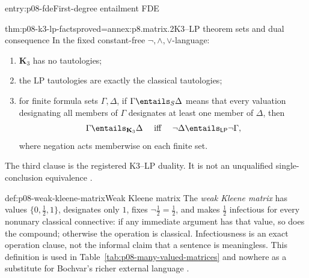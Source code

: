 \begin{systementry}{entry:p08-fde}{First-degree entailment FDE}
\end{systementry}

\begin{hbtheorem}{thm:p08-k3-lp-facts}{proved=annex:p8.matrix.2}{K3--LP theorem sets and dual consequence}
In the fixed constant-free \(\neg,\land,\lor\)-language:
\begin{enumerate}
  \item \(\mathbf K_3\) has no tautologies;
  \item the LP tautologies are exactly the classical tautologies;
  \item for finite formula sets \(\Gamma,\Delta\), if
        \(\Gamma\entails_S\Delta\) means that every valuation designating all
        members of \(\Gamma\) designates at least one member of \(\Delta\),
        then
        \[
          \Gamma\entails_{\mathbf K_3}\Delta
          \quad\text{ iff }\quad
          \neg\Delta\entails_{\mathsf{LP}}\neg\Gamma,
        \]
        where negation acts memberwise on each finite set.
\end{enumerate}
The third clause is the registered K3--LP duality.  It is not an unqualified
single-conclusion equivalence \cite{Priest1979,OmoriWansing2017}.
\end{hbtheorem}

\begin{hbdefinition}{def:p08-weak-kleene-matrix}{Weak Kleene matrix}
The \emph{weak Kleene matrix} has values
\(\{0,\tfrac12,1\}\), designates only \(1\), fixes
\(\neg\tfrac12=\tfrac12\), and makes \(\tfrac12\) infectious for every
nonunary classical connective: if any immediate argument has that value, so
does the compound; otherwise the operation is classical.  Infectiousness is
an exact operation clause, not the informal claim that a sentence is
meaningless.  This definition is used in Table~\ref{tab:p08-many-valued-matrices}
and nowhere as a substitute for Bochvar's richer external language
\cite{Kleene1952}.
\end{hbdefinition}

